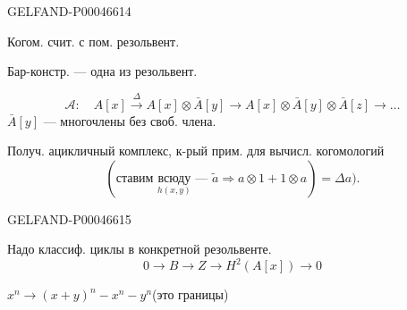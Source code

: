\begin{GelfandAdjacentEvidence}{GELFAND-P000466}{14}


Когом. счит. с пом. резольвент.

Бар-констр. — одна из резольвент.

\[
\mathcal A:\quad
A[x]\xrightarrow{\Delta}A[x]\otimes\bar A[y]
\longrightarrow A[x]\otimes\bar A[y]\otimes\bar A[z]\longrightarrow\ldots
\]
$\bar A[y]$ — многочлены без своб. члена.

Получ. ацикличный комплекс, к-рый прим. для вычисл. когомологий
\[
(\text{ставим }\underset{h(x,y)}{\text{всюду}}\text{ — }
\tilde a\Rightarrow a\otimes1+1\otimes a)=\Delta a).
\]
\end{GelfandAdjacentEvidence}
\begin{GelfandAdjacentEvidence}{GELFAND-P000466}{15}


Надо классиф. циклы в конкретной резольвенте.
\[
0\longrightarrow B\longrightarrow Z\longrightarrow H^2(A[x])\longrightarrow0
\]
\end{GelfandAdjacentEvidence}


$x^n\longrightarrow(x+y)^n-x^n-y^n$\qquad (это границы)



